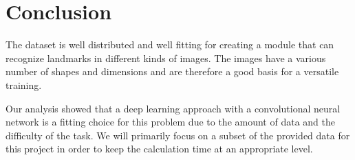 \chapter{Conclusion}

The dataset is well distributed and well fitting for creating a module that can recognize landmarks in different kinds of images. The images have a various number of shapes and dimensions and are therefore a good basis for a versatile training.

Our analysis showed that a deep learning approach with a convolutional neural network is a fitting choice for this problem due to the amount of data and the difficulty of the task. We will primarily focus on a subset of the provided data for this project in order to keep the calculation time at an appropriate level.